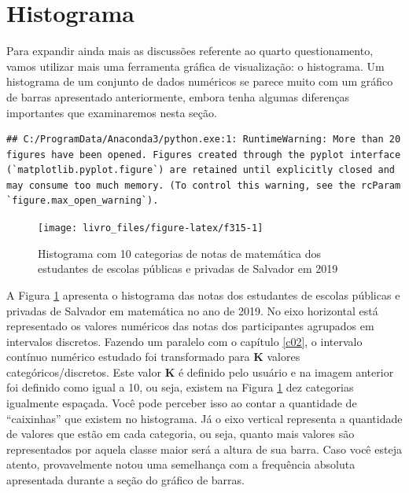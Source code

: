 \documentclass[
  oneside]{book}
\begin{document}
\hypertarget{ghist}{%
\section{Histograma}\label{ghist}}

Para expandir ainda mais as discussões referente ao quarto questionamento, vamos utilizar mais uma ferramenta gráfica de visualização: o histograma. Um histograma de um conjunto de dados numéricos se parece muito com um gráfico de barras apresentado anteriormente, embora tenha algumas diferenças importantes que examinaremos nesta seção.

\begin{verbatim}
## C:/ProgramData/Anaconda3/python.exe:1: RuntimeWarning: More than 20 figures have been opened. Figures created through the pyplot interface (`matplotlib.pyplot.figure`) are retained until explicitly closed and may consume too much memory. (To control this warning, see the rcParam `figure.max_open_warning`).
\end{verbatim}

\begin{figure}

{\centering \texttt{[image: livro\_files/figure-latex/f315-1]} 

}

\caption{Histograma com 10 categorias de notas de matemática dos estudantes de escolas públicas e privadas de Salvador em 2019}\label{fig:f315}
\end{figure}

A Figura \ref{fig:f315} apresenta o histograma das notas dos estudantes de escolas públicas e privadas de Salvador em matemática no ano de 2019. No eixo horizontal está representado os valores numéricos das notas dos participantes agrupados em intervalos discretos. Fazendo um paralelo com o capítulo \ref{c02}, o intervalo contínuo numérico estudado foi transformado para \textbf{K} valores categóricos/discretos. Este valor \textbf{K} é definido pelo usuário e na imagem anterior foi definido como igual a 10, ou seja, existem na Figura \ref{fig:f315} dez categorias igualmente espaçada. Você pode perceber isso ao contar a quantidade de ``caixinhas'' que existem no histograma. Já o eixo vertical representa a quantidade de valores que estão em cada categoria, ou seja, quanto mais valores são representados por aquela classe maior será a altura de sua barra. Caso você esteja atento, provavelmente notou uma semelhança com a frequência absoluta apresentada durante a seção do gráfico de barras.
\end{document}
